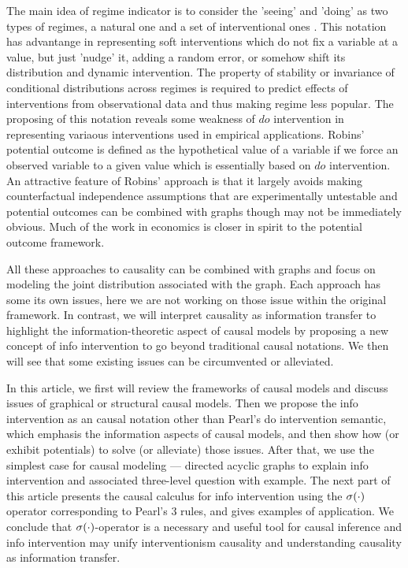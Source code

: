 The main idea of regime indicator is to consider the 'seeing' and 'doing' as two types of regimes, a natural one and a set of interventional ones \cite{dawid2015statistical}. This notation has advantange in representing soft interventions  which do not fix a variable at a value, but just 'nudge' it, adding a random error, or somehow shift its distribution \cite{eberhardt2007interventions} and dynamic intervention.  The property of stability \cite{dawid2010identifying} or invariance \cite{hausman1999independence} of conditional distributions across regimes is required to predict effects of interventions from observational data and thus making regime less popular. The proposing of this notation reveals some weakness of $do$ intervention in representing variaous interventions used in empirical applications. Robins' potential outcome is defined as the hypothetical value of a variable if we force an observed variable to a given value which is essentially based on $do$ intervention. An attractive feature of Robins' approach is that it largely avoids making counterfactual independence assumptions that are experimentally untestable and potential outcomes can be combined with graphs though may not be immediately obvious\cite{Richardson2011, richardson2013single, Marloes2018}.  Much of the  work in economics is closer in spirit to the potential outcome framework\cite{Imbens2019}. 

 

All these approaches to causality can be combined with graphs and focus on modeling the joint distribution associated with the graph. Each approach has some its own issues,  here we are not working on those issue within the original framework. In contrast,  we will interpret causality as information transfer to highlight the information-theoretic aspect of causal models  by proposing a new concept of info intervention to go beyond traditional causal notations. We then will see that some existing issues  can be circumvented or alleviated. 

  
In this article, we first will review the frameworks of causal models and discuss issues of graphical or structural causal models. Then we propose the info intervention as an causal notation other than Pearl’s do intervention semantic, which emphasis the information aspects of causal models, and then show how (or exhibit potentials) to solve (or alleviate) those issues. After that, we use the simplest case for causal modeling --- directed acyclic graphs to explain info intervention and associated three-level question with example. The next part of this article presents the causal calculus for info intervention using the $\mathrm{\sigma}(\cdot)$ operator corresponding to Pearl's 3 rules, and gives examples of application. We conclude that $\mathrm{\sigma}(\cdot)$-operator is a necessary and useful tool for causal inference and info intervention may unify interventionism causality and understanding causality as information transfer.


